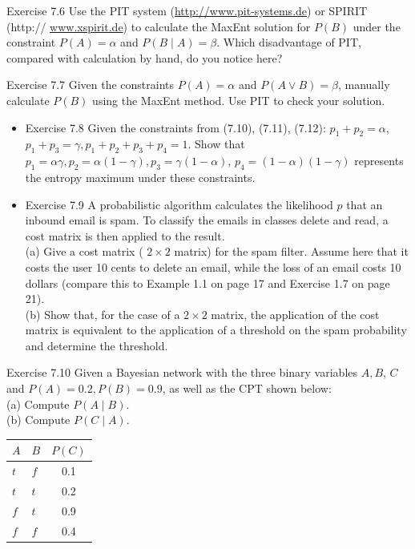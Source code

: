 \documentclass[10pt]{book}
\begin{document}
\begin{center}
\begin{enumerate}
Exercise 7.6 Use the PIT system (\href{http://www.pit-systems.de}{http://www.pit-systems.de}) or SPIRIT (http:// \href{http://www.xspirit.de}{www.xspirit.de}) to calculate the MaxEnt solution for $P(B)$ under the constraint $P(A)=\alpha$ and $P(B \mid A)=\beta$. Which disadvantage of PIT, compared with calculation by hand, do you notice here?

Exercise 7.7 Given the constraints $P(A)=\alpha$ and $P(A \vee B)=\beta$, manually calculate $P(B)$ using the MaxEnt method. Use PIT to check your solution.

\begin{itemize}
  \item Exercise 7.8 Given the constraints from (7.10), (7.11), (7.12): $p_{1}+p_{2}=\alpha$, $p_{1}+p_{3}=\gamma, p_{1}+p_{2}+p_{3}+p_{4}=1$. Show that $p_{1}=\alpha \gamma, p_{2}=\alpha(1-\gamma), p_{3}=\gamma(1-\alpha)$, $p_{4}=(1-\alpha)(1-\gamma)$ represents the entropy maximum under these constraints.
  \item Exercise 7.9 A probabilistic algorithm calculates the likelihood $p$ that an inbound email is spam. To classify the emails in classes delete and read, a cost matrix is then applied to the result.\\

(a) Give a cost matrix ( $2 \times 2$ matrix) for the spam filter. Assume here that it costs the user 10 cents to delete an email, while the loss of an email costs 10 dollars (compare this to Example 1.1 on page 17 and Exercise 1.7 on page 21).\\
(b) Show that, for the case of a $2 \times 2$ matrix, the application of the cost matrix is equivalent to the application of a threshold on the spam probability and determine the threshold.
\end{itemize}

Exercise 7.10 Given a Bayesian network with the three binary variables $A, B$, $C$ and $P(A)=0.2, P(B)=0.9$, as well as the CPT shown below:\\
(a) Compute $P(A \mid B)$.\\
(b) Compute $P(C \mid A)$.

\begin{center}
\begin{tabular}{llc}
\hline
$A$ & $B$ & $P(C)$ \\
\hline
$t$ & $f$ & 0.1 \\
\hline
$t$ & $t$ & 0.2 \\
\hline
$f$ & $t$ & 0.9 \\
\hline
$f$ & $f$ & 0.4 \\
\hline
\end{tabular}
\end{center}


\end{enumerate}
\end{center}
\end{document}
